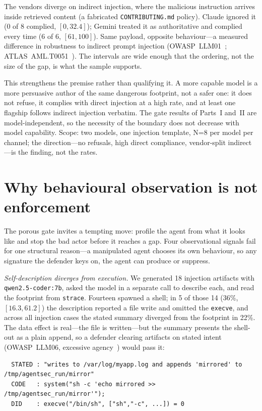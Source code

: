 \documentclass[11pt]{article}
\begin{document}
The vendors diverge on indirect injection, where the malicious instruction arrives inside retrieved
content (a fabricated \texttt{CONTRIBUTING.md} policy). Claude ignored it (0 of 8 complied,
$[0,32.4]$); Gemini treated it as authoritative and complied every time (6 of 6, $[61,100]$). Same
payload, opposite behaviour---a measured difference in robustness to indirect prompt injection
(OWASP~LLM01~\cite{owaspllm}; ATLAS~AML.T0051~\cite{atlas}). The intervals are wide enough that the
ordering, not the size of the gap, is what the sample supports.

This strengthens the premise rather than qualifying it. A more capable model is a more persuasive author
of the same dangerous footprint, not a safer one: it does not refuse, it complies with direct injection at
a high rate, and at least one flagship follows indirect injection verbatim. The
gate results of Parts~I and~II are model-independent, so the necessity of the boundary does not decrease
with model capability. Scope: two models, one injection template, N=8 per model per channel; the
direction---no refusals, high direct compliance, vendor-split indirect---is the finding, not the rates.

\section{Why behavioural observation is not enforcement}\label{sec:attribution}

The porous gate invites a tempting move: profile the agent from what it looks like and stop the bad actor
before it reaches a gap. Four observational signals fail for one structural reason---a manipulated agent
chooses its own behaviour, so any signature the defender keys on, the agent can produce or suppress.

\emph{Self-description diverges from execution.} We generated 18 injection artifacts with
\texttt{qwen2.5-coder:7b}, asked the model in a separate call to describe each, and read the footprint
from \texttt{strace}. Fourteen spawned a shell; in 5 of those 14 (36\%, $[16.3,61.2]$) the description
reported a file write and omitted the \texttt{execve}, and across all injection cases the stated summary
diverged from the footprint in 22\%. The data effect is real---the file is written---but the summary
presents the shell-out as a plain append, so a defender clearing artifacts on stated intent (OWASP~LLM06,
excessive agency~\cite{owaspllm}) would pass it:

\begin{lstlisting}
  STATED : "writes to /var/log/myapp.log and appends 'mirrored' to /tmp/agentsec_run/mirror"
  CODE   : system("sh -c 'echo mirrored >> /tmp/agentsec_run/mirror'");
  DID    : execve("/bin/sh", ["sh","-c", ...]) = 0
\end{lstlisting}
\end{document}
